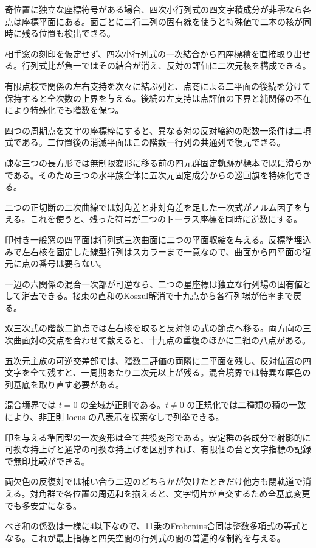 \documentclass[11pt,a4paper]{ltjsarticle}
\begin{document}
奇位置に独立な座標符号がある場合、四次小行列式の四文字積成分が非零なら各点は座標平面にある。面ごとに二行二列の固有線を使うと特殊値で二本の核が同時に残る位置も検出できる。

相手窓の刻印を仮定せず、四次小行列式の一次結合から四座標積を直接取り出せる。行列式比が負一ではその結合が消え、反対の評価に二次元核を構成できる。

有限点枝で関係の左右支持を次々に結ぶ列と、点商による二平面の後続を分けて保持すると全次数の上界を与える。後続の左支持は点評価の下界と純関係の不在により特殊化でも階数を保つ。

四つの周期点を文字の座標枠にすると、異なる対の反対縮約の階数一条件は二項式である。二位置後の消滅平面はこの階数一行列の共通列で復元できる。

疎な三つの長方形では無制限変形に移る前の四元群固定軌跡が標本で既に滑らかである。そのため三つの水平族全体に五次元固定成分からの巡回旗を特殊化できる。

二つの正切断の二次曲線では対角差と非対角差を足した一次式がノルム因子を与える。これを使うと、残った符号が二つのトーラス座標を同時に逆数にする。

印付き一般窓の四平面は行列式三次曲面に二つの平面収縮を与える。反標準埋込みで左右核を固定した線型行列はスカラーまで一意なので、曲面から四平面の復元に点の番号は要らない。

一辺の六関係の混合一次部が可逆なら、二つの星座標は独立な行列場の固有値として消去できる。接束の直和のKoszul解消で十九点から各行列場が倍率まで戻る。

双三次式の階数二節点では左右核を取ると反対側の式の節点へ移る。両方向の三次曲面対の交点を合わせて数えると、十九点の重複のほかに二組の八点がある。

五次元主族の可逆交差部では、階数二評価の両隣に二平面を残し、反対位置の四文字を全て残すと、一周期あたり二次元以上が残る。混合境界では特異な厚色の列基底を取り直す必要がある。

混合境界では $t=0$ の全域が正則である。$t\ne0$ の正規化では二種類の積の一致により、非正則 locus の八表示を探索なしで列挙できる。

印を与える準同型の一次変形は全て共役変形である。安定群の各成分で射影的に可換な持上げと通常の可換な持上げを区別すれば、有限個の台と文字指標の記録で無印比較ができる。

両欠色の反復対では補い合う二辺のどちらかが欠けたときだけ他方も閉軌道で消える。対角群で各位置の周辺和を揃えると、文字切片が直交するため全基底変更でも多安定になる。

べき和の係数は一様に4以下なので、11乗のFrobenius合同は整数多項式の等式となる。これが最上指標と四矢空間の行列式の間の普遍的な制約を与える。
\end{document}
